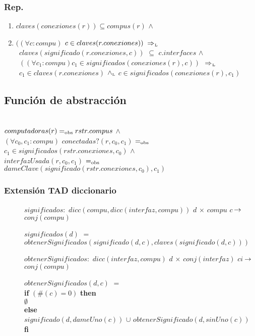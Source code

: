 \subsubsection*{Rep.}
\begin{enumerate}
\item[] $claves(conexiones(r)) \subseteq compus(r)$ $\land$
\item[] $((\forall c : compu)$ $c \in claves(r.conexiones)) \impluego$ \\
		\indent $\ \ claves(significado(r.conexiones,c))$ $\subseteq$ $c.interfaces$ $\land$ \\
		\indent $\ \ ((\forall c_1 : compu) c_1 \in significados(conexiones(r),c))$ $\impluego$ \\
		\indent $\ \ c_1 \in claves(r.conexiones)$ $\land_{\mathrm{\scriptscriptstyle{L}}}$ $c \in significados(conexiones(r),c_1)$ \\
\end{enumerate}

\subsection{Función de abstracción}

 \\
$computadoras(r) =_{\mathrm{obs}} rstr.compus$ $\land$ \\
$(\forall c_0,c_1:compu)$ $conectadas?(r,c_0,c_1)$ $=_{\mathrm{obs}}$ $c_1 \in significados(rstr.conexiones,c_0)$ $\land$\\
$interfazUsada(r,c_0,c_1)$ $=_{\mathrm{obs}}$ $dameClave(significado(rstr.conexiones,c_0),c_1)$

\subsubsection*{Extensión TAD diccionario}
\begin{description} 
\item[] $significados:$ $dicc(compu,dicc(interfaz,compu))$ $d$ $\times$ $compu$ $c$ $\!\rightarrow\!$ $conj(compu)$ \setlength{\parindent}{1cm} \indent
\item[] $significados(d)$ $=$  $obtenerSignificados(significado(d,c),claves(significado(d,c)))$
\\
\item[] $obtenerSignificados:$ $dicc(interfaz,compu)$ $d$ $\times$ $conj(interfaz)$ $ci$ $\!\rightarrow\!$ $conj(compu)$ \setlength{\parindent}{0.1cm} \indent
\item[] $obtenerSignificados(d,c)$ $=$
	\setlength{\parindent}{1cm}\\ \textbf{if} $(\#(c) = 0)$ \textbf{then}
		\\ \indent$\emptyset$
	\\ \textbf{else} 
		\\\indent  $significado(d,dameUno(c))$ $\cup$ $obtenerSignificado(d,sinUno(c))$
	\\  \textbf{fi} 
\end{description}

